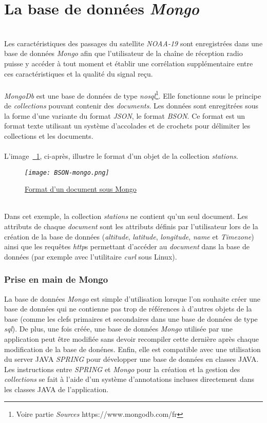 \documentclass[12pt,fleqn]{book} %
\begin{document}
\section{La base de données \emph{Mongo}}
~\\\indent Les caractéristiques des passages du satellite \emph{NOAA-19} sont enregistrées dans une base de données \emph{Mongo} afin que l'utilisateur de la chaîne de réception radio puisse y accéder à tout moment et établir une corrélation supplémentaire entre ces caractéristiques et la qualité du signal reçu.
~\\\\\emph{MongoDb} est une base de données de type \emph{nosql}\footnote{Voire partie \emph{Sources} https://www.mongodb.com/fr}. Elle fonctionne sous le principe de \emph{collections} pouvant contenir des \emph{documents}. Les données sont enregitrées sous la forme d'une variante du format \emph{JSON}, le format \emph{BSON}. Ce format est un format texte utilisant un système d'accolades et de crochets pour délimiter les collections et les documents. 
~\\\\L'image~\underline{\color{blue}~\ref{BSON-mongo}}, ci-après, illustre le format d'un objet de la collection \emph{stations}.
~\\
\begin{figure}[H]
	\centering
	\itshape
	\texttt{[image: BSON-mongo.png]}
	\caption{\label{BSON-mongo} \underline{Format d'un document sous Mongo}}
\end{figure}
~\\\noindent Dans cet exemple, la collection \emph{stations} ne contient qu'un seul document. Les attributs de chaque \emph{document} sont les attributs définis par l'utilisateur lors de la création de la base de données (\emph{altitude}, \emph{latitude}, \emph{longitude}, \emph{name} et \emph{Timezone}) ainsi que les requêtes \emph{http}s permettant d'accéder au \emph{document} dans la base de données (par exemple avec l'utilitaire \emph{curl} sous Linux).
\subsubsection{Prise en main de Mongo}
\noindent La base de données \emph{Mongo} est simple d'utilisation lorsque l'on souhaite créer une base de données qui ne contienne pas trop de références à d'autres objets de la base (comme les clefs primaires et secondaires dans une base de données de type \emph{sql}). De plus, une fois créée, une base de données \emph{Mongo} utilisée par une application peut être modifiée sans devoir recompiler cette dernière après chaque modification de la base de donénes. Enfin, elle est compatible avec une utilisation du server JAVA \emph{SPRING} pour développer une base de données en classes JAVA. Les instructions entre \emph{SPRING} et \emph{Mongo} pour la création et la gestion des \emph{collections} se fait à l'aide d'un système d'annotations incluses directement dans les classes JAVA de l'application.
\end{document}
